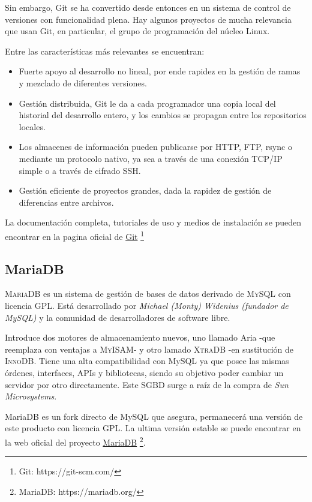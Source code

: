 \documentclass[12pt]{book} %
\begin{document}
		Sin embargo, Git se ha convertido desde entonces en un sistema de control de versiones con funcionalidad plena. Hay algunos
		proyectos de mucha relevancia que usan Git, en particular, el grupo de programación del núcleo Linux.
		
		Entre las características más relevantes se encuentran:
		\begin{multicols}{2}
			\begin{itemize}
				\item Fuerte apoyo al desarrollo no lineal, por ende rapidez en la gestión de ramas y mezclado de diferentes versiones. 
				\item Gestión distribuida, Git le da a cada programador una copia local del historial del desarrollo entero, y los 
				cambios se propagan entre los repositorios locales. 
				\item Los almacenes de información pueden publicarse por HTTP, FTP, rsync o mediante un protocolo nativo, ya sea a través 
				de una conexión TCP/IP simple o a través de cifrado SSH.
				\item Gestión eficiente de proyectos grandes, dada la rapidez de gestión de diferencias entre archivos.
			\end{itemize}
		\end{multicols}
		
		La documentación completa, tutoriales de uso y medios de instalación se pueden encontrar en la pagina oficial de 
		\href{https://git-scm.com/}{Git} \footnote{\scriptsize Git: https://git-scm.com/}
	
		
	\subsection{MariaDB \label{maria}}
		\textsc{MariaDB} es un sistema de gestión de bases de datos derivado de \textsc{MySQL} con licencia \textsc{GPL}. 
		Está desarrollado por \textit{Michael (Monty) Widenius (fundador de MySQL)} y la comunidad de desarrolladores de software 
		libre. 
		
		Introduce dos motores de almacenamiento nuevos, uno llamado Aria -que reemplaza con ventajas a \textsc{MyISAM}- y otro
		lamado \textsc{XtraDB} -en sustitución de \textsc{InnoDB}. Tiene una alta compatibilidad con MySQL ya que posee las mismas
		órdenes, interfaces, APIs y bibliotecas, siendo su objetivo poder cambiar un servidor por otro directamente. 
		Este \textsc{SGBD} surge a raíz de la compra de \textit{Sun Microsystems}.
		
		MariaDB es un fork directo de MySQL que asegura, permanecerá una versión de este producto con licencia GPL. 
		La ultima versión estable se puede encontrar en la web oficial del proyecto \href{https://mariadb.org/}{MariaDB} 
		\footnote{\scriptsize MariaDB: https://mariadb.org/}.
		
\end{document}
